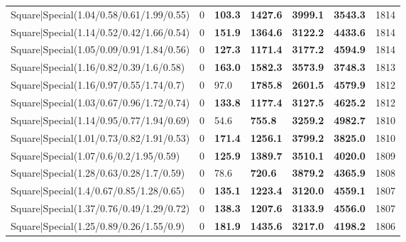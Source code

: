 \begin{tabular}{lrllllr}
 Square|Special(1.04/0.58/0.61/1.99/0.55)                      &             0   & \textbf{103.3} & \textbf{1427.6} & \textbf{3999.1} & \textbf{3543.3} &         1814 \\
 Square|Special(1.14/0.52/0.42/1.66/0.54)                      &             0   & \textbf{151.9} & \textbf{1364.6} & \textbf{3122.2} & \textbf{4433.6} &         1814 \\
 Square|Special(1.05/0.09/0.91/1.84/0.56)                      &             0   & \textbf{127.3} & \textbf{1171.4} & \textbf{3177.2} & \textbf{4594.9} &         1814 \\
 Square|Special(1.16/0.82/0.39/1.6/0.58)                       &             0   & \textbf{163.0} & \textbf{1582.3} & \textbf{3573.9} & \textbf{3748.3} &         1813 \\
 Square|Special(1.16/0.97/0.55/1.74/0.7)                       &             0   & 97.0           & \textbf{1785.8} & \textbf{2601.5} & \textbf{4579.9} &         1812 \\
 Square|Special(1.03/0.67/0.96/1.72/0.74)                      &             0   & \textbf{133.8} & \textbf{1177.4} & \textbf{3127.5} & \textbf{4625.2} &         1812 \\
 Square|Special(1.14/0.95/0.77/1.94/0.69)                      &             0   & 54.6           & \textbf{755.8}  & \textbf{3259.2} & \textbf{4982.7} &         1810 \\
 Square|Special(1.01/0.73/0.82/1.91/0.53)                      &             0   & \textbf{171.4} & \textbf{1256.1} & \textbf{3799.2} & \textbf{3825.0} &         1810 \\
 Square|Special(1.07/0.6/0.2/1.95/0.59)                        &             0   & \textbf{125.9} & \textbf{1389.7} & \textbf{3510.1} & \textbf{4020.0} &         1809 \\
 Square|Special(1.28/0.63/0.28/1.7/0.59)                       &             0   & 78.6           & \textbf{720.6}  & \textbf{3879.2} & \textbf{4365.9} &         1808 \\
 Square|Special(1.4/0.67/0.85/1.28/0.65)                       &             0   & \textbf{135.1} & \textbf{1223.4} & \textbf{3120.0} & \textbf{4559.1} &         1807 \\
 Square|Special(1.37/0.76/0.49/1.29/0.72)                      &             0   & \textbf{138.3} & \textbf{1207.6} & \textbf{3133.9} & \textbf{4556.0} &         1807 \\
 Square|Special(1.25/0.89/0.26/1.55/0.9)                       &             0   & \textbf{181.9} & \textbf{1435.6} & \textbf{3217.0} & \textbf{4198.2} &         1806 \\

\end{tabular}
